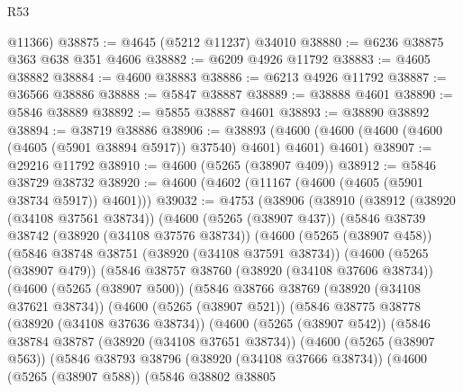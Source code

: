 \begin{lexlean}{R53}
\begin{coremodule}
      @11366)
@38875 := @4645 (@5212 @11237) @34010
@38880 := @6236 @38875 @363 @638 @351 @4606
@38882 := @6209 @4926 @11792
@38883 := @4605 @38882
@38884 := @4600 @38883
@38886 := @6213 @4926 @11792
@38887 := @36566 @38886
@38888 := @5847 @38887
@38889 := @38888 @4601
@38890 := @5846 @38889
@38892 := @5855 @38887 @4601
@38893 := @38890 @38892
@38894 := @38719 @38886
@38906 := @38893
    (@4600 (@4600 (@4600 (@4600 (@4605 (@5901 @38894 @5917)) @37540) @4601) @4601) @4601)
@38907 := @29216 @11792
@38910 := @4600 (@5265 (@38907 @409))
@38912 := @5846 @38729 @38732
@38920 := @4600 (@4602 (@11167 (@4600 (@4605 (@5901 @38734 @5917)) @4601)))
@39032 := @4753
    (@38906
      (@38910
        (@38912
          (@38920 (@34108 @37561 @38734))
          (@4600
            (@5265 (@38907 @437))
            (@5846
              @38739
              @38742
              (@38920 (@34108 @37576 @38734))
              (@4600
                (@5265 (@38907 @458))
                (@5846
                  @38748
                  @38751
                  (@38920 (@34108 @37591 @38734))
                  (@4600
                    (@5265 (@38907 @479))
                    (@5846
                      @38757
                      @38760
                      (@38920 (@34108 @37606 @38734))
                      (@4600
                        (@5265 (@38907 @500))
                        (@5846
                          @38766
                          @38769
                          (@38920 (@34108 @37621 @38734))
                          (@4600
                            (@5265 (@38907 @521))
                            (@5846
                              @38775
                              @38778
                              (@38920 (@34108 @37636 @38734))
                              (@4600
                                (@5265 (@38907 @542))
                                (@5846
                                  @38784
                                  @38787
                                  (@38920 (@34108 @37651 @38734))
                                  (@4600
                                    (@5265 (@38907 @563))
                                    (@5846
                                      @38793
                                      @38796
                                      (@38920 (@34108 @37666 @38734))
                                      (@4600
                                        (@5265 (@38907 @588))
                                        (@5846
                                          @38802
                                          @38805

\end{coremodule}
\end{lexlean}

